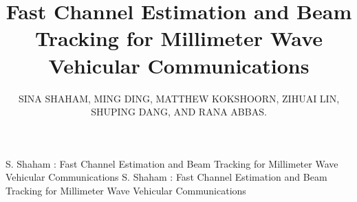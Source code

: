\documentclass{ieeeaccess}
\begin{document}


\title{Fast Channel Estimation and Beam Tracking for Millimeter Wave Vehicular Communications}

\author{\uppercase{sina shaham}, \uppercase{Ming Ding}, \uppercase{Matthew Kokshoorn}, \uppercase{Zihuai Lin},
\uppercase{Shuping Dang, and Rana Abbas}.}


\address[1]{Department of Engineering, The University of Sydney, Sydney, NSW, 2006 Australia}
\address[2]{Data61, Sydney, NSW, 1435 Australia}
\address[3]{Department of Engineering, The University of Sydney, Sydney, NSW, 2006 Australia}
\address[4]{Department of Engineering, The University of Sydney, Sydney, NSW, 2006 Australia}
\address[5]{Computer, Electrical and Mathematical Sciences and Engineering Division, King Abdullah University of Science and Technology, Thuwal 23955-6900, Saudi Arabia}
\address[6]{Department of Engineering, The University of Sydney, Sydney, NSW, 2006 Australia}




\markboth
{S. Shaham \headeretal: Fast Channel Estimation and Beam Tracking for Millimeter Wave Vehicular Communications}
{S. Shaham \headeretal: Fast Channel Estimation and Beam Tracking for Millimeter Wave Vehicular Communications}
\end{document}
